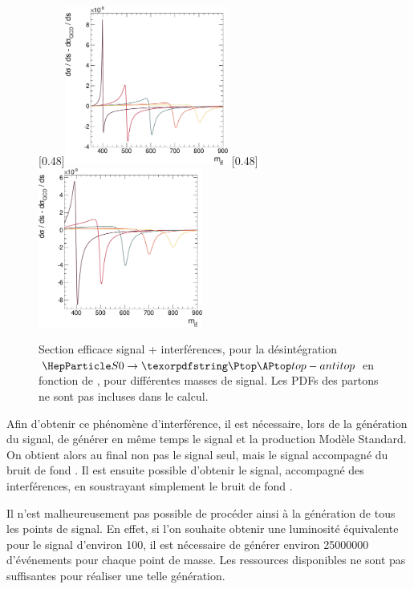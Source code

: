 \begin{figure}[tbp] \centering
    [0.48\textwidth]{\includegraphics[width=0.48\textwidth]{chapitre8/figs/S0/theory_scalar.pdf}}
    [0.48\textwidth]{\includegraphics[width=0.48\textwidth]{chapitre8/figs/S0/theory_pseudoscalar.pdf}}
    \caption{Section efficace signal + interférences, pour la désintégration $\sz \rightarrow \ttbar$ en fonction de \mtt, pour différentes masses de signal. Les PDFs des partons ne sont pas incluses dans le calcul.}
    \label{fig:theo_sigma}
\end{figure}

\bigskip

Afin d'obtenir ce phénomène d'interférence, il est nécessaire, lors de la génération du signal, de générer en même temps le signal et la production \ttbar Modèle Standard. On obtient alors au final non pas le signal seul, mais le signal accompagné du bruit de fond \ttbar. Il est ensuite possible d'obtenir le signal, accompagné des interférences, en soustrayant simplement le bruit de fond \ttbar.

\smallskip

Il n'est malheureusement pas possible de procéder ainsi à la génération de tous les points de signal. En effet, si l'on souhaite obtenir une luminosité équivalente pour le signal d'environ \SI{100}{\invfb}, il est nécessaire de générer environ \num{25000000} d'événements pour chaque point de masse. Les ressources disponibles ne sont pas suffisantes pour réaliser une telle génération.

